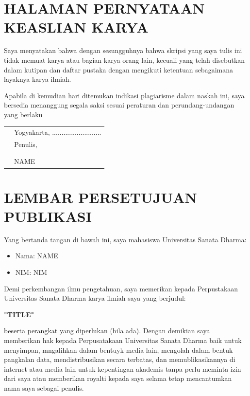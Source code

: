 \documentclass[oneside,12pt, a4paper]{book}
\def\title{TITLE}
\def\author{NAME}
\def\nim{NIM}
\numberwithin{equation}{chapter}
\begin{document}

\clearpage
\chapter{\centering HALAMAN PERNYATAAN KEASLIAN KARYA}
\begin{doublespace}
	Saya menyatakan bahwa dengan sesungguhnya bahwa skripsi yang saya tulis ini tidak memuat karya atau bagian karya orang lain, kecuali yang telah disebutkan dalam kutipan dan daftar pustaka dengan mengikuti ketentuan sebagaimana layaknya karya ilmiah.
	
	Apabila di kemudian hari ditemukan indikasi plagiarisme dalam naskah ini, saya bersedia menanggung segala saksi sesuai peraturan dan perundang-undangan yang berlaku
	
	\vspace{5cm}
	\begin{tabularx}{\textwidth}{
			>{\raggedright\arraybackslash}m{7cm}
			>{\raggedleft\arraybackslash}X
		}
		& Yogyakarta, ..........................\\
		& Penulis,\\
		&\\
		&\\
		& \author
	\end{tabularx}
\end{doublespace}

\clearpage
\chapter{\centering LEMBAR PERSETUJUAN PUBLIKASI}
\noindent Yang bertanda tangan di bawah ini, saya mahasiswa Universitas Sanata Dharma:
\begin{itemize}[label={}]
	\item Nama\quad: \author
	\item NIM\quad: \nim
\end{itemize}

\noindent Demi perkembangan ilmu pengetahuan, saya memerikan kepada Perpustakaan Universitas Sanata Dharma karya ilmiah saya yang berjudul:
\vspace{1cm}
\begin{center}
	\textbf{"\title"}
\end{center}
\vspace{1cm}
\noindent beserta perangkat yang diperlukan (bila ada). Dengan demikian saya memberikan hak kepada Perpusatakaan Universitas Sanata Dharma baik untuk menyimpan, mngalihkan dalam bentuyk media lain, mengolah dalam bentuk pangkalan data, mendistribusikan secara terbatas, dan memublikasikannya di internet atau media lain untuk kepentingan akademis tanpa perlu meminta izin dari saya atau memberikan royalti kepada saya selama tetap mencantumkan nama saya sebagai penulis.
\end{document}
